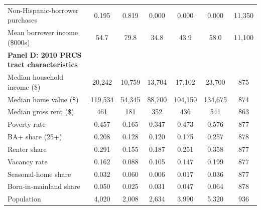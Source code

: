 \begin{table}[H]
{\begin{tabular}{lcccccc}
    \multicolumn{1}{l}{Non-Hispanic-borrower purchases} & 0.195 & 0.819 & 0.000 & 0.000 & 0.000 & 11,350 \\
    \multicolumn{1}{l}{Mean borrower income (\$000s)} & 54.7 & 79.8 & 34.8 & 43.9 & 58.0 & 11,100 \\
    \textbf{Panel D: 2010 PRCS tract characteristics} & & & & & & \\
    \multicolumn{1}{l}{Median household income (\$)} & 20,242 & 10,759 & 13,704 & 17,102 & 23,700 & 875 \\
    \multicolumn{1}{l}{Median home value (\$)} & 119,534 & 54,345 & 88,700 & 104,150 & 134,675 & 874 \\
    \multicolumn{1}{l}{Median gross rent (\$)} & 461 & 181 & 352 & 436 & 541 & 863 \\
    \multicolumn{1}{l}{Poverty rate} & 0.457 & 0.165 & 0.347 & 0.473 & 0.576 & 877 \\
    \multicolumn{1}{l}{BA+ share (25+)} & 0.208 & 0.128 & 0.120 & 0.175 & 0.257 & 878 \\
    \multicolumn{1}{l}{Renter share} & 0.291 & 0.155 & 0.187 & 0.251 & 0.358 & 877 \\
    \multicolumn{1}{l}{Vacancy rate} & 0.162 & 0.088 & 0.105 & 0.147 & 0.199 & 877 \\
    \multicolumn{1}{l}{Seasonal-home share} & 0.032 & 0.060 & 0.006 & 0.017 & 0.036 & 877 \\
    \multicolumn{1}{l}{Born-in-mainland share} & 0.050 & 0.025 & 0.031 & 0.047 & 0.064 & 878 \\
    \multicolumn{1}{l}{Population} & 4,020 & 2,008 & 2,634 & 3,990 & 5,320 & 936 \\
\midrule\bottomrule
\end{tabular}
}
\label{tab:summary_stats}
\end{table}
